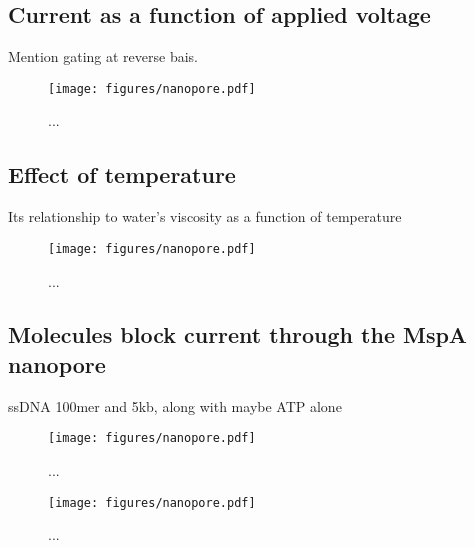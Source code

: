 \subsection{Current as a function of applied voltage}

Mention gating at reverse bais.

\begin{figure}[h]
\begin{centering}
\texttt{[image: figures/nanopore.pdf]}
\caption[MspA current versus voltage]{...}
\label{fig:iv_mspa}
\end{centering}
\end{figure}

\subsection{Effect of temperature}

Its relationship to water's viscosity as a function of temperature

\begin{figure}[h]
\begin{centering}
\texttt{[image: figures/nanopore.pdf]}
\caption[MspA current versus temperature]{...}
\label{fig:mspa_current_temp}
\end{centering}
\end{figure}

\subsection{Molecules block current through the MspA nanopore}

ssDNA 100mer and 5kb, along with maybe ATP alone

\begin{figure}[h]
\begin{centering}
\texttt{[image: figures/nanopore.pdf]}
\caption[100mer ssDNA in the MspA nanopore]{...}
\label{fig:mspa_100mer}
\end{centering}
\end{figure}

\begin{figure}[h]
\begin{centering}
\texttt{[image: figures/nanopore.pdf]}
\caption[5.3kb ssDNA in the MspA nanopore]{...}
\label{fig:mspa_5kb}
\end{centering}
\end{figure}

